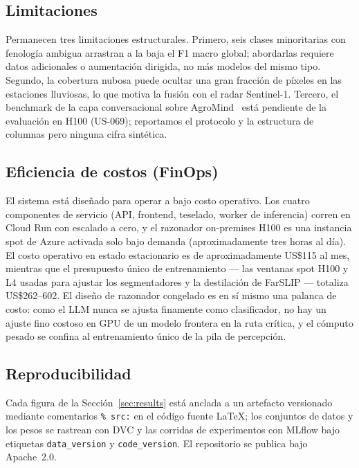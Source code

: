 \subsection{Limitaciones}
Permanecen tres limitaciones estructurales. Primero, seis clases
minoritarias con fenología ambigua arrastran a la baja el F1 macro
global; abordarlas requiere datos adicionales o aumentación dirigida, no
más modelos del mismo tipo. Segundo, la cobertura nubosa puede ocultar
una gran fracción de píxeles en las estaciones lluviosas, lo que motiva
la fusión con el radar Sentinel-1. Tercero, el benchmark de la capa
conversacional sobre AgroMind~\cite{ruan2025agromind} está pendiente de
la evaluación en H100 (US-069); reportamos el protocolo y la estructura
de columnas pero ninguna cifra sintética.

\subsection{Eficiencia de costos (FinOps)}
El sistema está diseñado para operar a bajo costo operativo. Los cuatro
componentes de servicio (API, frontend, teselado, worker de inferencia)
corren en Cloud Run con escalado a cero, y el razonador on-premises H100
es una instancia spot de Azure activada solo bajo demanda
(aproximadamente tres horas al día). El costo operativo en estado
estacionario es de aproximadamente US\$115 al mes, mientras que el
presupuesto único de entrenamiento --- las ventanas spot H100 y L4 usadas
para ajustar los segmentadores y la destilación de FarSLIP --- totaliza
US\$262--602. El diseño de razonador congelado es en sí mismo una palanca
de costo: como el LLM nunca se ajusta finamente como clasificador, no hay
un ajuste fino costoso en GPU de un modelo frontera en la ruta crítica, y
el cómputo pesado se confina al entrenamiento único de la pila de
percepción.

\subsection{Reproducibilidad}
Cada figura de la Sección~\ref{sec:results} está anclada a un artefacto
versionado mediante comentarios \texttt{\% src:} en el código fuente
LaTeX; los conjuntos de datos y los pesos se rastrean con DVC y las
corridas de experimentos con MLflow bajo etiquetas
\texttt{data\_version} y \texttt{code\_version}. El repositorio se
publica bajo Apache~2.0.
